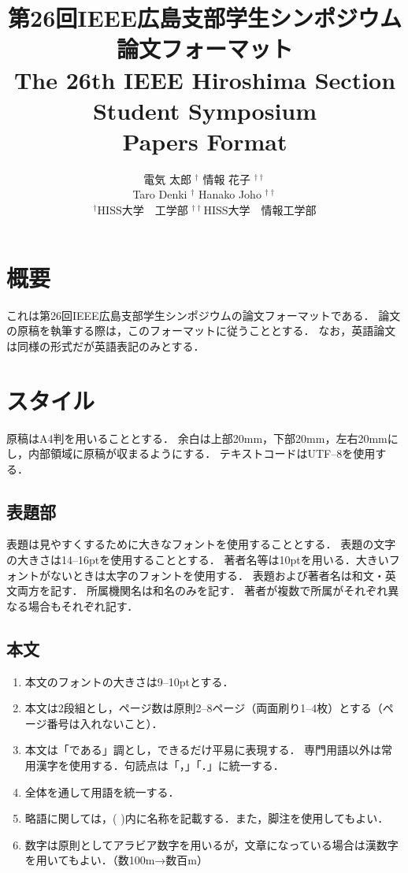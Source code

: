 \documentclass[a4j,twocolumn,10pt]{jarticle}
\title{ 第26回IEEE広島支部学生シンポジウム論文フォーマット\\
The 26th IEEE Hiroshima Section Student Symposium \\
Papers Format
}
\author{%
電気 太郎 $^{\dagger}$ 情報 花子 $^{\dagger\dagger}$ \\
Taro Denki $^{\dagger}$ Hanako Joho $^{\dagger\dagger}$\\
$^{\dagger}$HISS大学　工学部 \hspace*{1em}
 $^{\dagger\dagger}$HISS大学　情報工学部 %
}
\begin{document}
\maketitle
\thispagestyle{empty} %
\pagestyle{empty} %
\baselineskip=4.5mm %

\section{概要}
これは第26回IEEE広島支部学生シンポジウムの論文フォーマットである．
論文の原稿を執筆する際は，このフォーマットに従うこととする．
なお，英語論文は同様の形式だが英語表記のみとする．

\section{スタイル}
原稿はA4判を用いることとする．
余白は上部20mm，下部20mm，左右20mmにし，内部領域に原稿が収まるようにする．
テキストコードはUTF--8を使用する．

\subsection{表題部}
表題は見やすくするために大きなフォントを使用することとする．
表題の文字の大きさは14--16ptを使用することとする．
著者名等は10ptを用いる．大きいフォントがないときは太字のフォントを使用する．
表題および著者名は和文・英文両方を記す．
所属機関名は和名のみを記す．
著者が複数で所属がそれぞれ異なる場合もそれぞれ記す．

\subsection{本文}
\begin{enumerate}
\item 本文のフォントの大きさは9--10ptとする．
\item 本文は2段組とし，ページ数は原則2--8ページ（両面刷り1--4枚）とする（ページ番号は入れないこと）．
\item 本文は「である」調とし，できるだけ平易に表現する．
専門用語以外は常用漢字を使用する．句読点は「，」「．」に統一する．
\item 全体を通して用語を統一する．
\item 略語に関しては，( )内に名称を記載する．また，脚注を使用してもよい．
\item 数字は原則としてアラビア数字を用いるが，文章になっている場合は漢数字を用いてもよい．（数100m→数百m）
\end{enumerate}
\vspace{-3mm}
\end{document}
